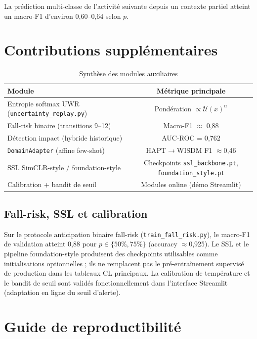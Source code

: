 La prédiction multi-classe de l'activité suivante depuis un contexte partiel
atteint un macro-F1 d'environ 0,60--0,64 selon $p$.

\section{Contributions supplémentaires}

\begin{table}[H]
\centering
\small
\begin{tabularx}{0.75\textwidth}{|Y|c|}
\hline
\textbf{Module} & \textbf{Métrique principale} \\
\hline
Entropie softmax UWR (\texttt{uncertainty\_replay.py}) & Pondération $\propto \mathcal{U}(x)^{\alpha}$ \\
Fall-risk binaire (transitions 9--12)            & Macro-F1 $\approx$ 0,88 \\
Détection impact (hybride historique)            & AUC-ROC = 0,762 \\
\texttt{DomainAdapter} (affine few-shot)              & HAPT$\rightarrow$WISDM F1 $\approx$0,46 \\
SSL SimCLR-style / foundation-style              & Checkpoints \texttt{ssl\_backbone.pt}, \texttt{foundation\_style.pt} \\
Calibration + bandit de seuil                    & Modules online (démo Streamlit) \\
\hline
\end{tabularx}
\caption{Synthèse des modules auxiliaires}
\label{tab:aux_modules}
\end{table}

\subsection{Fall-risk, SSL et calibration}

Sur le protocole anticipation binaire fall-risk
(\texttt{train\_fall\_risk.py}), le macro-F1 de validation atteint 0,88 pour
$p\in\{50\%,75\%\}$ (accuracy $\approx$0,925). Le SSL et le pipeline
foundation-style produisent des checkpoints utilisables comme initialisations
optionnelles ; ils ne remplacent pas le pré-entraînement supervisé de
production dans les tableaux CL principaux. La calibration de température et
le bandit de seuil sont validés fonctionnellement dans l'interface Streamlit
(adaptation en ligne du seuil d'alerte).

\section{Guide de reproductibilité}

